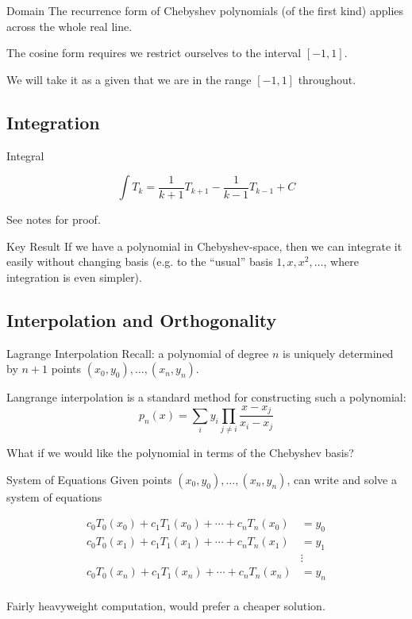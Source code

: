\documentclass[pdf]{beamer}
\begin{document}
\begin{frame}{Domain}
  The recurrence form of Chebyshev polynomials (of the first kind) applies
  across the whole real line.\newline

  The cosine form requires we restrict ourselves to the interval $[-1,1]$.\newline

  We will take it as a given that we are in the range $[-1,1]$ throughout.
\end{frame}

\subsection{Integration}

\begin{frame}{Integral}
  \begin{center}
    \[ \int T_k = \frac{1}{k+1} T_{k+1} - \frac{1}{k-1} T_{k-1} + C\]
  \end{center}

  See notes for proof.
\end{frame}


\begin{frame}{Key Result}
  If we have a polynomial in Chebyshev-space, then we can integrate it easily
  without changing basis (e.g. to the ``usual'' basis $1, x, x^2,\ldots$, where
  integration is even simpler).
\end{frame}

\subsection{Interpolation and Orthogonality}

\begin{frame}{Lagrange Interpolation}
  Recall: a polynomial of degree $n$ is uniquely determined by $n+1$ points $(x_0, y_0),\ldots,(x_n, y_n)$.\newline

  Langrange interpolation is a standard method for constructing such a polynomial:
  \[ p_n(x) = \sum_i y_i \prod_{j \neq i} \frac{x - x_j}{x_i - x_j} \]

  What if we would like the polynomial in terms of the Chebyshev basis?
\end{frame}


\begin{frame}{System of Equations}
  Given points $(x_0, y_0),\ldots,(x_n, y_n)$, can write and solve a system of equations

  \begin{align*}
  c_0T_0(x_0) + c_1T_1(x_0) + \cdots + c_nT_n(x_0) &= y_0\\
  c_0T_0(x_1) + c_1T_1(x_1) + \cdots + c_nT_n(x_1) &= y_1\\
   & \vdots\\
  c_0T_0(x_n) + c_1T_1(x_n) + \cdots + c_nT_n(x_n) &= y_n\\
  \end{align*}

  Fairly heavyweight computation, would prefer a cheaper solution.
\end{frame}
\end{document}
